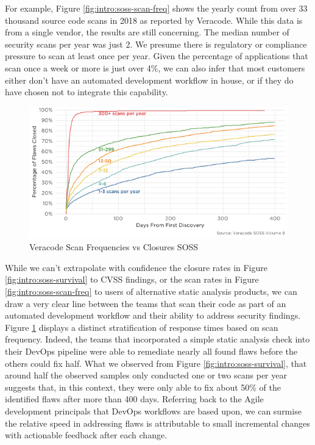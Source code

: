 For example, Figure \ref{fig:intro:soss-scan-freq} shows the yearly count from over 33 thousand source code scans in 2018 as reported by Veracode. While this data is from a single vendor, the results are still concerning. The median number of security scans per year was just 2. We presume there is regulatory or compliance pressure to scan at least once per year. Given the percentage of applications that scan once a week or more is just over 4\%, we can also infer that most customers either don't have an automated development workflow in house, or if they do have chosen not to integrate this capability. 


\begin{figure}[ht]
\centering
\includegraphics[width=.9\linewidth]{resource/img/ch_intro/veracode_scanfreq_vs_closures.png}
\caption{Veracode Scan Frequencies vs Closures SOSS \cite{soss_v9}}
\label{fig:intro:soss-scan-freq-closures}
\end{figure} 

While we can't extrapolate with confidence the closure rates in Figure \ref{fig:intro:soss-survival} to CVSS findings, or the scan rates in Figure \ref{fig:intro:soss-scan-freq} to users of alternative static analysis products, we can draw a very clear line between the teams that scan their code as part of an automated development workflow and their ability to address security findings. Figure \ref{fig:intro:soss-scan-freq-closures} displays a distinct stratification of response times based on scan frequency. Indeed, the teams that incorporated a simple static analysis check into their DevOps pipeline were able to remediate nearly all found flaws before the others could fix half. What we observed from Figure \ref{fig:intro:soss-survival}, that around half the observed samples only conducted one or two scans per year suggests that, in this context, they were only able to fix about 50\% of the identified flaws after more than 400 days. Referring back to the Agile development principals that DevOps workflows are based upon, we can surmise the relative speed in addressing flaws is attributable to small incremental changes with actionable feedback after each change. 




